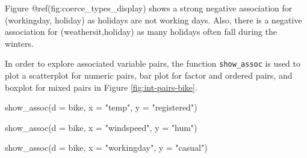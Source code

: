 Figure @ref(fig:coerce\_types\_display) shows a strong negative
association for (workingday, holiday) as holidays are not working days.
Also, there is a negative association for (weathersit,holiday) as many
holidays often fall during the winters.

In order to explore associated variable pairs, the function
\texttt{show\_assoc} is used to plot a scatterplot for numeric pairs,
bar plot for factor and ordered pairs, and boxplot for mixed pairs in
Figure \ref{fig:int-pairs-bike}.

\begin{Schunk}
\begin{Sinput}
show_assoc(d = bike, 
           x = "temp", 
           y = "registered")

show_assoc(d = bike, 
           x = "windspeed", 
           y = "hum")

show_assoc(d = bike, 
           x = "workingday", 
           y = "casual")


\end{Sinput}
\end{Schunk}
